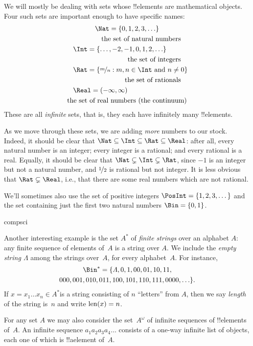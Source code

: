 \documentclass[../../../include/open-logic-section]{subfiles}
\begin{document}

\begin{ex}
We will mostly be dealing with sets whose !!{element}s are
mathematical objects. Four such sets are important enough to have
specific names:
\begin{multline*}
    \Nat = \{0, 1, 2, 3, \ldots\} \\
    \shoveright{\text{the set of natural numbers}}\\
    \shoveleft{\Int = \{\ldots, -2, -1, 0, 1, 2, \ldots\}} \\
    \shoveright{\text{the set of integers}}\\
    \shoveleft{\Rat = \Setabs{\nicefrac{m}{n}}{m, n \in \Int\text{ and }n \neq 0}}\\
    \shoveright{\text{the set of rationals}}\\
    \shoveleft{\Real = (-\infty, \infty)}\\
    \text{the set of real numbers (the continuum)}
\end{multline*}
These are all \emph{infinite} sets, that is, they each have
infinitely many !!{element}s.

As we move through these sets, we are adding \emph{more} numbers to
our stock. Indeed, it should be clear that $\Nat \subseteq \Int
\subseteq \Rat \subseteq \Real$: after all, every natural number is an
integer; every integer is a rational; and every rational is a real.
Equally, it should be clear that $\Nat \subsetneq \Int \subsetneq
\Rat$, since $-1$ is an integer but not a natural number, and
$\nicefrac{1}{2}$ is rational but not integer. It is less obvious
that $\Rat \subsetneq \Real$, i.e., that there are some real numbers
which are not rational. 

We'll sometimes also use the set of positive integers $\PosInt = \{1,
2, 3, \dots\}$ and the set containing just the first two natural
numbers $\Bin = \{0, 1\}$.
\end{ex}

\begin{tagblock}{compsci}
\begin{ex}[Strings] 
Another interesting example  is the set $A^{*}$ of \emph{finite
strings} over an alphabet $A$: any finite sequence of elements of~$A$
is a string over $A$. We include the \emph{empty string $\Lambda$}
among the strings over~$A$, for every alphabet~$A$. For instance,
\begin{multline*}
\Bin^*
=\{\Lambda,0,1,00,01,10,11,\\
000,001,010,011,100,101,110,111,0000,\ldots\}.
\end{multline*}
If $x=x_{1}\ldots x_{n}\in A^{*}$is a string consisting of $n$
``letters'' from $A$, then we say \emph{length} of the string is~$n$
and write $\mathrm{len}(x)=n$.
\end{ex}
\end{tagblock}

\begin{ex}
For any set $A$ we may also consider the set~$A^\omega$ of infinite
sequences of !!{element}s of~$A$. An infinite sequence
$a_1a_2a_3a_4\dots$ consists of a one-way infinite list of objects,
each one of which is !!a{element} of~$A$.
\end{ex}
\end{document}
